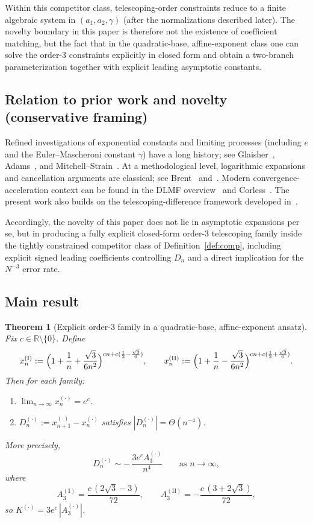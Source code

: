 \documentclass[11pt]{article}
\newtheorem{theorem}{Theorem}[section]
\theoremstyle{definition}
\newcommand{\R}{\mathbb{R}}
\begin{document}
Within this competitor class, telescoping-order constraints reduce to a finite
algebraic system in $(a_1,a_2,\gamma)$ (after the normalizations described later).
The novelty boundary in this paper is therefore not the existence of coefficient
matching, but the fact that in the quadratic-base, affine-exponent class one can
solve the order-$3$ constraints explicitly in closed form and obtain a two-branch
parameterization together with explicit leading asymptotic constants.

\subsection{Relation to prior work and novelty (conservative framing)}
Refined investigations of exponential constants and limiting processes (including
$e$ and the Euler--Mascheroni constant $\gamma$) have a long history; see
Glaisher~\cite{glaisher}, Adams~\cite{adams}, and Mitchell--Strain~\cite{mitchell}.
At a methodological level, logarithmic expansions and cancellation arguments are
classical; see Brent~\cite{brent} and~\cite{flajolet}. Modern
convergence-acceleration context can be found in the DLMF
overview~\cite{dlmf39} and Corless~\cite{corless2023}. The present work also builds
on the telescoping-difference framework developed in~\cite{balditerative}.

Accordingly, the novelty of this paper does not lie in asymptotic expansions per
se, but in producing a fully explicit closed-form order-$3$ telescoping family
inside the tightly constrained competitor class of Definition~\ref{def:comp},
including explicit signed leading coefficients controlling $D_n$ and a direct
implication for the $N^{-3}$ error rate.

\subsection{Main result}
\begin{theorem}[Explicit order-$3$ family in a quadratic-base, affine-exponent ansatz]\label{thm:main}
Fix $c\in\R\setminus\{0\}$. Define
\[
  x_n^{(\mathrm{I})} := \Bigl(1+\frac1n+\frac{\sqrt3}{6n^2}\Bigr)^{cn+c(\frac12-\frac{\sqrt3}{6})},
  \qquad
  x_n^{(\mathrm{II})} := \Bigl(1+\frac1n-\frac{\sqrt3}{6n^2}\Bigr)^{cn+c(\frac12+\frac{\sqrt3}{6})}.
\]
Then for each family:
\begin{enumerate}
  \item $\displaystyle \lim_{n\to\infty} x_n^{(\cdot)} = e^{c}$.
  \item $D_n^{(\cdot)} := x_{n+1}^{(\cdot)} - x_n^{(\cdot)}$ satisfies
        $|D_n^{(\cdot)}| = \Theta(n^{-4})$.
\end{enumerate}
More precisely,
\begin{equation}\label{eq:mainasy}
  D_n^{(\cdot)} \sim -\,\frac{3e^{c}A_3^{(\cdot)}}{n^{4}}
  \qquad\text{as } n\to\infty,
\end{equation}
where
\[
  A_3^{(\mathrm{I})} = \frac{c\,(2\sqrt3-3)}{72},
  \qquad
  A_3^{(\mathrm{II})} = -\frac{c\,(3+2\sqrt3)}{72},
\]
so $K^{(\cdot)} = 3e^{c}\,|A_3^{(\cdot)}|$.
\end{theorem}
\end{document}
